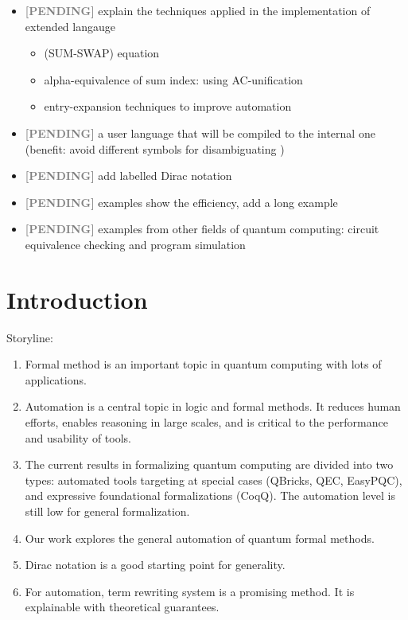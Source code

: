 \documentclass[manuscript, review, timestamp]{acmart}
\newcommand*{\pending}{\textcolor{gray}{\textbf{ [PENDING] }}}
\begin{document}
\begin{itemize}
    \item \pending explain the techniques applied in the implementation of extended langauge
        \begin{itemize}
            \item (SUM-SWAP) equation
            \item alpha-equivalence of sum index: using AC-unification
            \item entry-expansion techniques to improve automation
        \end{itemize}
    \item \pending a user language that will be compiled to the internal one (benefit: avoid different symbols for disambiguating )
    \item \pending add labelled Dirac notation
    \item \pending examples show the efficiency, add a long example
    \item \pending examples from other fields of quantum computing: circuit equivalence checking and program simulation
\end{itemize}

\clearpage
\tableofcontents

\clearpage

\section{Introduction}
Storyline:
\begin{enumerate}
    \item Formal method is an important topic in quantum computing with lots of applications.
    \item Automation is a central topic in logic and formal methods. It reduces human efforts, enables reasoning in large scales, and is critical to the performance and usability of tools.
    \item The current results in formalizing quantum computing are divided into two types: automated tools targeting at special cases (QBricks, QEC, EasyPQC), and expressive foundational formalizations (CoqQ). The automation level is still low for general formalization.
    \item Our work explores the general automation of quantum formal methods.
    \item Dirac notation is a good starting point for generality.
    \item For automation, term rewriting system is a promising method. It is explainable with theoretical guarantees.
\end{enumerate}
\end{document}
